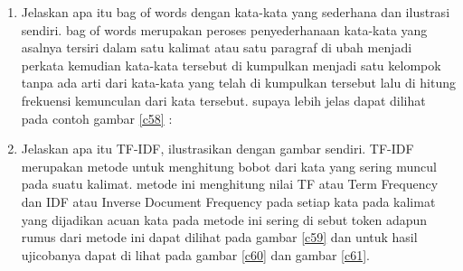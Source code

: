 \begin{enumerate}
\item Jelaskan apa itu bag of words dengan kata-kata yang sederhana dan ilustrasi sendiri.
 bag of words merupakan peroses penyederhanaan kata-kata yang asalnya tersiri dalam satu kalimat atau satu paragraf di ubah menjadi perkata kemudian kata-kata tersebut di kumpulkan menjadi satu kelompok tanpa ada arti dari kata-kata yang telah di kumpulkan tersebut lalu di hitung frekuensi kemunculan dari kata tersebut. supaya lebih jelas dapat dilihat pada contoh gambar \ref{c58} :

\item Jelaskan apa itu TF-IDF, ilustrasikan dengan gambar sendiri.
 TF-IDF merupakan metode untuk menghitung bobot dari kata yang sering muncul pada suatu kalimat. metode ini menghitung nilai TF atau Term Frequency dan IDF atau Inverse Document Frequency pada setiap kata pada kalimat yang dijadikan acuan kata pada metode ini sering di sebut token adapun rumus dari metode ini dapat dilihat pada gambar \ref{c59} dan untuk hasil ujicobanya dapat di lihat pada gambar \ref{c60} dan gambar \ref{c61}.

\end{enumerate}

